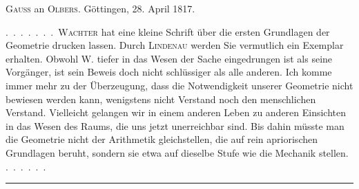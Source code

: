 \clearpage{}
\begin{center}\textsc{Gauss} an \textsc{Olbers}. Göttingen, 28. April 1817.\end{center}

.\ .\ .\ .\ .\ .\ .\ \textsc{Wachter} hat eine kleine Schrift über die
ersten Grundlagen der Geometrie drucken lassen. Durch \textsc{Lindenau} werden Sie vermutlich
ein Exemplar erhalten. Obwohl W. tiefer in das Wesen der Sache
eingedrungen ist als seine Vorgänger, ist sein Beweis doch nicht
schlüssiger als alle anderen. Ich komme immer mehr zu der Überzeugung, dass die
Notwendigkeit unserer Geometrie nicht bewiesen werden kann, wenigstens
nicht  \textbf{} Verstand noch  den menschlichen Verstand.
Vielleicht gelangen wir in einem anderen Leben zu anderen Einsichten in das
Wesen des Raums, die uns jetzt unerreichbar sind. Bis dahin müsste man die
Geometrie nicht der Arithmetik gleichstellen, die auf rein apriorischen Grundlagen beruht, sondern sie etwa
auf dieselbe Stufe wie die Mechanik stellen. .\ .\ .\ .\ .\ .

\begin{center}\rule{3cm}{0.4pt}\end{center}

